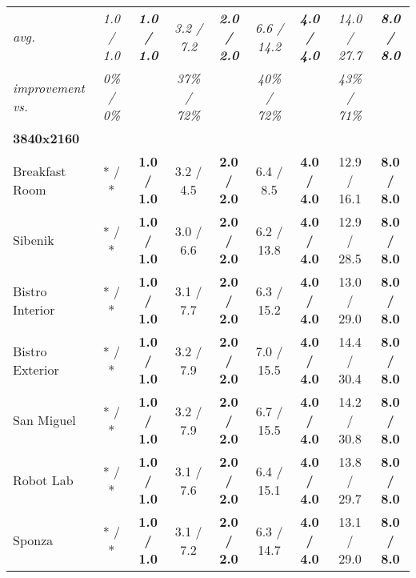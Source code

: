 \begin{table*}[t]
\begin{tabular}{l cc|cc|cc|cc}
            		\hline
            		\textit{avg.} & \textit{1.0 / 1.0} & \textit{\textbf{1.0 / 1.0}} & \textit{3.2 / 7.2} & \textit{\textbf{2.0 / 2.0}} & \textit{6.6 / 14.2} & \textit{\textbf{4.0 / 4.0}} & \textit{14.0 / 27.7} & \textit{\textbf{8.0 / 8.0}} \\
            		\textit{improvement vs.} & \textit{0\% / 0\%}  & & \textit{37\% / 72\%} & & \textit{40\% / 72\%} & & \textit{43\% / 71\%} & \\
            		\hline
            		\textbf{3840x2160}            &                      &                             &                      &                             &                      &                             &                      &                             \\
            		Breakfast Room                & * / *                & \textbf{1.0 / 1.0}          & 3.2 / 4.5            & \textbf{2.0 / 2.0}          & 6.4 / 8.5            & \textbf{4.0 / 4.0}          & 12.9 / 16.1          & \textbf{8.0 / 8.0}          \\
            		Sibenik                       & * / *                & \textbf{1.0 / 1.0}          & 3.0 / 6.6            & \textbf{2.0 / 2.0}          & 6.2 / 13.8           & \textbf{4.0 / 4.0}          & 12.9 / 28.5          & \textbf{8.0 / 8.0}          \\
            		Bistro Interior               & * / *                & \textbf{1.0 / 1.0}          & 3.1 / 7.7            & \textbf{2.0 / 2.0}          & 6.3 / 15.2           & \textbf{4.0 / 4.0}          & 13.0 / 29.0          & \textbf{8.0 / 8.0}          \\
            		Bistro Exterior               & * / *                & \textbf{1.0 / 1.0}          & 3.2 / 7.9            & \textbf{2.0 / 2.0}          & 7.0 / 15.5           & \textbf{4.0 / 4.0}          & 14.4 / 30.4          & \textbf{8.0 / 8.0}          \\
            		San Miguel                    & * / *                & \textbf{1.0 / 1.0}          & 3.2 / 7.9            & \textbf{2.0 / 2.0}          & 6.7 / 15.5           & \textbf{4.0 / 4.0}          & 14.2 / 30.8          & \textbf{8.0 / 8.0}          \\
            		Robot Lab                     & * / *                & \textbf{1.0 / 1.0}          & 3.1 / 7.6            & \textbf{2.0 / 2.0}          & 6.4 / 15.1           & \textbf{4.0 / 4.0}          & 13.8 / 29.7          & \textbf{8.0 / 8.0}          \\
            		Sponza                        & * / *                & \textbf{1.0 / 1.0}          & 3.1 / 7.2            & \textbf{2.0 / 2.0}          & 6.3 / 14.7           & \textbf{4.0 / 4.0}          & 13.1 / 29.0          & \textbf{8.0 / 8.0}          \\

\end{tabular}
\end{table*}
